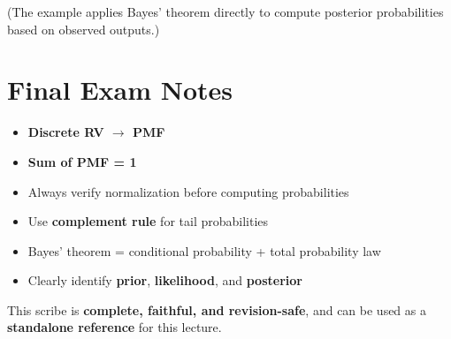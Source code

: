 \documentclass[12pt]{article}
\begin{document}
(The example applies Bayes’ theorem directly to compute posterior probabilities based on observed outputs.)

\section*{Final Exam Notes}

\begin{itemize}
\item \textbf{Discrete RV $\rightarrow$ PMF}
\item \textbf{Sum of PMF = 1}
\item Always verify normalization before computing probabilities
\item Use \textbf{complement rule} for tail probabilities
\item Bayes’ theorem = conditional probability + total probability law
\item Clearly identify \textbf{prior}, \textbf{likelihood}, and \textbf{posterior}
\end{itemize}

This scribe is \textbf{complete, faithful, and revision-safe}, and can be used as a \textbf{standalone reference} for this lecture.
\end{document}
